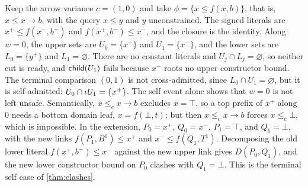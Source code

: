 \begin{example}\label{ex:self-event}
Keep the arrow variance $c=(1,0)$ and take $\phi=\{x\le f(x,b)\}$, that is,
$x\le x\to b$, with the query $x\le y$ and $y$ unconstrained. The signed
literals are $x^+\le f(x^-,b^+)$ and $f(x^+,b^-)\le x^-$, and the closure is
the identity. Along $w=0$, the upper sets are $U_0=\{x^+\}$ and
$U_1=\{x^-\}$, and the lower sets are $L_0=\{y^+\}$ and $L_1=\varnothing$.
There are no constant literals and $U_j\cap L_j=\varnothing$, so neither cut
is ready, and $\mathsf{child}(U_1)$ fails because $x^-$ roots no upper constructor
bound. The terminal comparison $(0,1)$ is not cross-admitted, since
$L_0\cap U_1=\varnothing$, but it is self-admitted:
$U_0\cap\iota U_1=\{x^+\}$. The self event alone shows that $w=0$ is not
left unsafe. Semantically, $x\le_c x\to b$ excludes $x=\top$, so a top prefix
of $x^+$ along $0$ needs a bottom domain leaf, $x=f(\bot,t)$; but then
$x\le_c x\to b$ forces $x\le_c\bot$, which is impossible.
In the extension, $P_0=x^+$, $Q_0=x^-$, $P_1=\top$, and $Q_1=\bot$, with the
new links $f(P_1,B^0)\le x^+$ and $x^-\le f(Q_1,T^1)$. Decomposing the old
lower literal $f(x^+,b^-)\le x^-$ against the new upper link gives
$D(P_0,Q_1)$, and the new lower constructor bound on $P_0$ clashes with
$Q_1=\bot$. This is the terminal self case of \cref{thm:clashes}.
\end{example}
